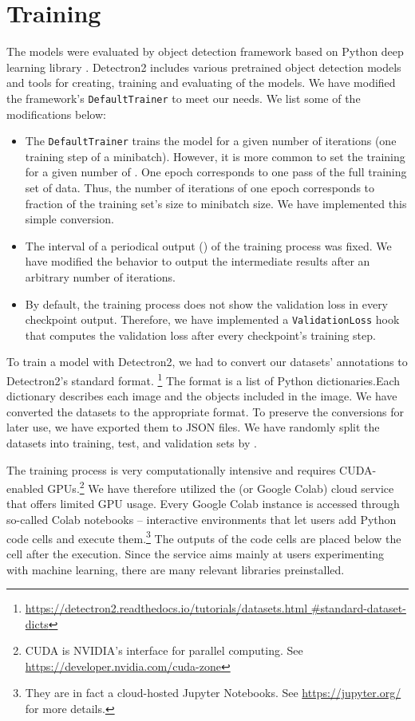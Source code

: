 \section{Training}
The models were evaluated by  object detection framework
\cite{detectron} based on Python deep learning library 
\cite{pytorch}. Detectron2 includes various pretrained object detection
models and tools for creating, training and evaluating of the models. We have
modified the framework's \texttt{DefaultTrainer} to meet our needs. We list
some of the modifications below:
\begin{itemize}
	\item The \texttt{DefaultTrainer} trains the model for a given number of
	      iterations (one training step of a minibatch). However, it is more
	      common to set the training for a given number of . One
	      epoch corresponds to one pass of the full training set of data. Thus,
	      the number of iterations of one epoch corresponds to fraction of the
	      training set's size to minibatch size. We have implemented this
	      simple conversion.
	\item The interval of a periodical output () of the
	      training process was fixed. We have modified the behavior to output the
	      intermediate results after an arbitrary number of iterations.
	\item By default, the training process does not show the validation loss in
	      every checkpoint output. Therefore, we have implemented a
	      \texttt{ValidationLoss} hook that computes the validation loss after every
	      checkpoint's training step.
\end{itemize}
To train a model with Detectron2, we had to convert our datasets' annotations to
Detectron2's standard format.
\footnote{
	\url{https://detectron2.readthedocs.io/tutorials/datasets.html
		\#standard-dataset-dicts}
}
The format is a list of Python dictionaries.Each dictionary describes each image
and the objects included in the image. We have converted the datasets to the
appropriate format. To preserve the conversions for later use, we have exported
them  to JSON files. We have randomly split the datasets into training, test,
and validation sets by .

The training process is very computationally intensive and requires CUDA-enabled
GPUs.\footnote{CUDA is NVIDIA's interface for parallel computing. See
	\url{https://developer.nvidia.com/cuda-zone}} We have therefore utilized the
 (or Google
Colab) cloud service that offers limited GPU usage. Every Google Colab instance
is accessed through so-called Colab notebooks -- interactive environments that
let users add Python code cells and execute them.\footnote{
	They are in fact a cloud-hosted Jupyter Notebooks. See
	\url{https://jupyter.org/} for more details.
} The outputs of the code cells are placed below the cell after the execution.
Since the service aims mainly at users experimenting with machine learning,
there are many relevant libraries preinstalled.


